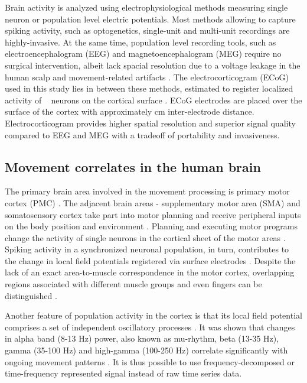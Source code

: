 \documentclass[letterpaper]{article} \usepackage{aaai22}  \usepackage{times}  \usepackage{helvet}  \usepackage{courier}  \usepackage[hyphens]{url}  \usepackage{graphicx} \urlstyle{rm} \def\UrlFont{\rm}  \usepackage{natbib}  \usepackage{caption} \DeclareCaptionStyle{ruled}{labelfont=normalfont,labelsep=colon,strut=off} \frenchspacing  \setlength{\pdfpagewidth}{8.5in}  \setlength{\pdfpageheight}{11in}  \usepackage{algorithm}
\begin{document}
Brain activity is analyzed using electrophysiological methods measuring single neuron or population level electric potentials. Most methods allowing to capture spiking activity, such as optogenetics, single-unit and multi-unit recordings are highly-invasive. At the same time, population level recording tools, such as electroencephalogram (EEG) and magnetoencephalogram (MEG) require no surgical intervention, albeit lack spacial resolution due to a voltage leakage in the human scalp and movement-related artifacts \citep{neilcuffin1979, hamalainen1993, jackson2014}. The electrocorticogram (ECoG) used in this study lies in between these methods, estimated to register localized activity of ~ neurons on the cortical surface \citep{engel2005}. ECoG electrodes are placed over the surface of the cortex with approximately  cm inter-electrode distance. Electrocorticogram provides higher spatial resolution and superior signal quality compared to EEG and MEG with a tradeoff of portability and invasiveness.

\subsection*{Movement correlates in the human brain}


The primary brain area involved in the movement processing is primary motor cortex (PMC) \citep{kakei1999}. The adjacent brain areas -  supplementary motor area (SMA) and somatosensory cortex take part into motor planning and receive peripheral inputs on the body position and environment \citep{tam2019}. Planning and executing motor programs change the activity of single neurons in the cortical sheet of the motor areas \citep{kakei1999}. Spiking activity in a synchronized neuronal population, in turn, contributes to the change in local field potentials registered via surface electrodes \citep{buzsaki2012}. Despite the lack of an exact area-to-muscle correspondence in the motor cortex, overlapping regions associated with different muscle groups and even fingers can be distinguished \citep{schieber2001,marjaninejad2017,georgopoulos2015}. 


Another feature of population activity in the cortex is that its local field potential comprises a set of independent oscillatory processes \citep{buzsaki2004}. It was shown that changes in alpha band (8-13 Hz) power, also known as mu-rhythm, beta (13-35 Hz), gamma (35-100 Hz) and high-gamma (100-250 Hz) correlate significantly with ongoing movement patterns \citep{tam2019, marjaninejad2017}. It is thus possible to use frequency-decomposed or time-frequency represented signal instead of raw time series data. 
\end{document}
